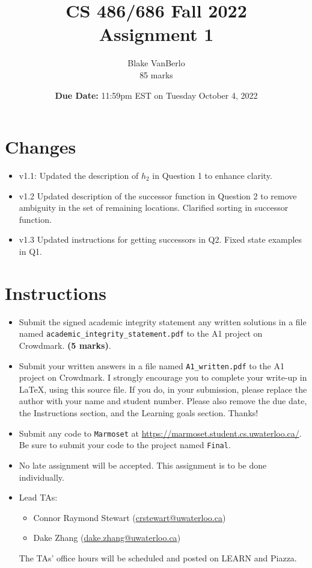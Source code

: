 \documentclass[12pt]{article}
\title{CS 486/686 Fall 2022 \\ Assignment 1 \\
}
\author{Blake VanBerlo \\ 85 marks}
\date{{\bf Due Date:} 11:59pm EST on Tuesday October 4, 2022}
\begin{document}
\maketitle

\section*{Changes}

\begin{itemize}
\item v1.1: Updated the description of $h_2$ in Question 1 to enhance clarity.
\item v1.2 Updated description of the successor function in Question 2 to remove ambiguity in the set of remaining locations. Clarified sorting in successor function.
\item v1.3 Updated instructions for getting successors in Q2. Fixed state examples in Q1.
\end{itemize}


\newpage
\section*{Instructions}

\begin{itemize}
\item
Submit the signed academic integrity statement any written solutions in a file named \verb+academic_integrity_statement.pdf+ to the A1 project on Crowdmark. \textbf{(5 marks)}.

\item Submit your written answers in a file named \verb+A1_written.pdf+ to the A1 project on Crowdmark. I strongly encourage you to complete your write-up in LaTeX, using this source file. If you do, in your submission, please replace the author with your name and student number. Please also remove the due date, the Instructions section, and the Learning goals section. Thanks!

\item Submit any code to \verb+Marmoset+ at \url{https://marmoset.student.cs.uwaterloo.ca/}. Be sure to submit your code to the project named \texttt{Final}. 

\item
No late assignment will be accepted. This assignment is to be done individually.


\item
Lead TAs: 
\begin{itemize}
\item 
Connor Raymond Stewart (\url{crstewart@uwaterloo.ca})
\item
Dake Zhang (\url{dake.zhang@uwaterloo.ca})
\end{itemize}
The TAs' office hours will be scheduled and posted on LEARN and Piazza.
\end{itemize}
\end{document}

